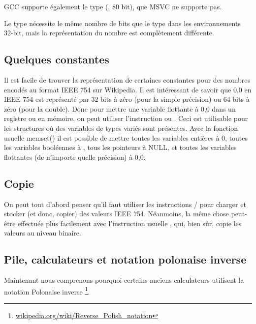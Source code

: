 GCC supporte également le type  (\FNURLEP,
80 bit), que MSVC ne supporte pas.

Le type \Tfloat nécessite le même nombre de bits que le type \Tint dans les environnements
32-bit, mais la représentation du nombre est complètement différente.





\subsection{Quelques constantes}

Il est facile de trouver la représentation de certaines constantes pour des nombres
encodés au format IEEE 754 sur Wikipedia.
Il est intéressant de savoir que 0,0 en IEEE 754 est représenté par 32 bits à zéro
(pour la simple précision) ou 64 bits à zéro (pour la double).
Donc pour mettre une variable flottante à 0,0 dans un registre ou en mémoire, on
peut utiliser l'instruction \MOV ou .
Ceci est utilisable pour les structures où des variables de types variés sont présentes.
Avec la fonction usuelle memset() il est possible de mettre toutes les variables
entières à 0, toutes les variables booléennes à , tous les pointeurs à
NULL, et toutes les variables flottantes (de n'importe quelle précision) à 0,0.

\subsection{Copie}

On peut tout d'abord penser qu'il faut utiliser les instructions /
pour charger et stocker (et donc, copier) des valeurs IEEE 754.
Néanmoins, la même chose peut-être effectuée plus facilement avec l'instruction usuelle
, qui, bien sûr, copie les valeurs au niveau binaire.

\subsection{Pile, calculateurs et notation polonaise inverse}


Maintenant nous comprenons pourquoi certains anciens calculateurs utilisent la notation
Polonaise inverse
\footnote{\href{http://go.yurichev.com/17354}{wikipedia.org/wiki/Reverse\_Polish\_notation}}.


